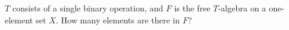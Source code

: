 $T$ consists of a single binary operation, and $F$ is the free $T$-algebra on a one-element set $X$. How many elements are there in $F$?
